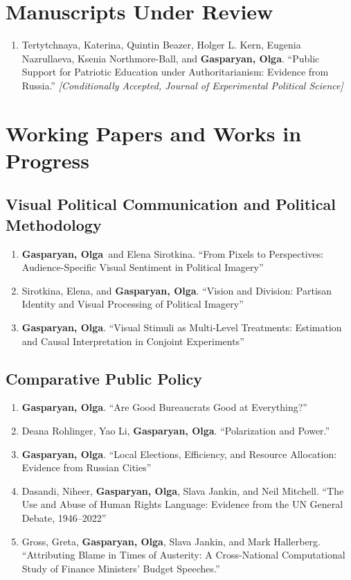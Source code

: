 \documentclass[10pt]{article}
\newcommand{\me}{\textbf{Gasparyan, Olga}}
\newcommand{\status}[1]{ {\small\textit{[#1]}}}
\begin{document}
\section{Manuscripts Under Review}
\begin{enumerate}
    \item Tertytchnaya, Katerina, Quintin Beazer, Holger L. Kern, Eugenia Nazrullaeva, Ksenia Northmore-Ball, and \me. ``Public Support for Patriotic Education under Authoritarianism: Evidence from Russia.'' \status{Conditionally Accepted, \textit{Journal of Experimental Political Science}}
\end{enumerate}

\section{Working Papers and Works in Progress}

\subsection{Visual Political Communication and Political Methodology}
\begin{enumerate}
    \item \me\ and Elena Sirotkina. ``From Pixels to Perspectives: Audience-Specific Visual Sentiment in Political Imagery'' 

    \item Sirotkina, Elena, and \me. ``Vision and Division: Partisan Identity and Visual Processing of Political Imagery'' 


    \item \me. ``Visual Stimuli as Multi-Level Treatments: Estimation and Causal Interpretation in Conjoint Experiments''
\end{enumerate}

\subsection{Comparative Public Policy}
\begin{enumerate}
    \item \me. ``Are Good Bureaucrats Good at Everything?''
    \item  Deana Rohlinger, Yao Li, \me. ``Polarization and Power.''

    \item \me. ``Local Elections, Efficiency, and Resource Allocation: Evidence from Russian Cities''

    \item Dasandi, Niheer, \me, Slava Jankin, and Neil Mitchell. ``The Use and Abuse of Human Rights Language: Evidence from the UN General Debate, 1946--2022''

    \item Gross, Greta, \me, Slava Jankin, and Mark Hallerberg. ``Attributing Blame in Times of Austerity: A Cross-National Computational Study of Finance Ministers' Budget Speeches.''
\end{enumerate}
\end{document}
